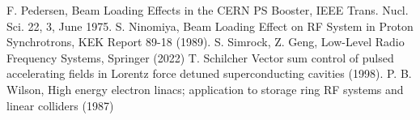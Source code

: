 \documentclass[book]{jlreq}
\begin{document}
%
\begin{thebibliography}{9}
    F. Pedersen, Beam Loading Effects in the CERN PS Booster, IEEE Trans. Nucl. Sci. 22, 3, June 1975.
    S. Ninomiya, Beam Loading Effect on RF System in Proton Synchrotrons, KEK Report 89-18 (1989).
    S. Simrock, Z. Geng, Low-Level Radio Frequency Systems, Springer (2022)
    T. Schilcher Vector sum control of pulsed accelerating fields in Lorentz force detuned superconducting cavities (1998).
    P. B. Wilson, High energy electron linacs; application to storage ring RF systems and linear colliders (1987)
\end{thebibliography}
%
%
\end{document}
